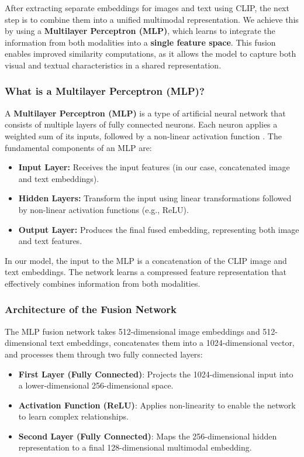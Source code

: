 \documentclass[nolibertine, english, algorithm, nomencl, minted]{ttlab-qualify}
\begin{document}
After extracting separate embeddings for images and text using CLIP, the next step is to 
combine them into a unified multimodal representation. We achieve this by using a \textbf{Multilayer Perceptron (MLP)}, 
which learns to integrate the information from both modalities into a \textbf{single feature space}. 
This fusion enables improved similarity computations, as it allows the model to capture both visual and textual characteristics in 
a shared representation.

\subsubsection{What is a Multilayer Perceptron (MLP)?}

A \textbf{Multilayer Perceptron (MLP)} is a type of artificial neural network that consists of 
multiple layers of fully connected neurons. 
Each neuron applies a weighted sum of its inputs, followed by a non-linear activation function \parencite{goodfellow2016deep}. 
The fundamental components of an MLP are:

\begin{itemize}
    \item \textbf{Input Layer:} Receives the input features (in our case, concatenated image and text embeddings).
    \item \textbf{Hidden Layers:} Transform the input using linear transformations followed by non-linear activation functions (e.g., ReLU).
    \item \textbf{Output Layer:} Produces the final fused embedding, representing both image and text features.
\end{itemize}

In our model, the input to the MLP is a concatenation of the CLIP image and text embeddings. 
The network learns a compressed feature representation that effectively combines information from both modalities.

\subsubsection{Architecture of the Fusion Network}

The MLP fusion network takes 512-dimensional image embeddings and 512-dimensional text embeddings, 
concatenates them into a 1024-dimensional vector, and processes them through two fully connected layers:

\begin{itemize}
    \item \textbf{First Layer (Fully Connected)}: Projects the 1024-dimensional input into a lower-dimensional 256-dimensional space.
    \item \textbf{Activation Function (ReLU)}: Applies non-linearity to enable the network to learn complex relationships.
    \item \textbf{Second Layer (Fully Connected)}: Maps the 256-dimensional hidden representation to a final 128-dimensional multimodal embedding.
\end{itemize}
\end{document}
